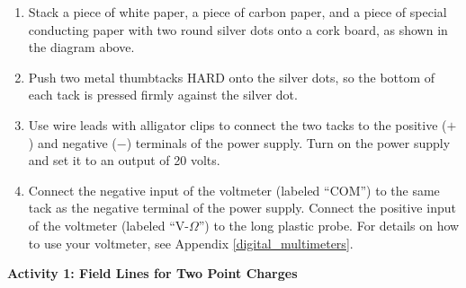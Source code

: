\begin{enumerate}[nosep]
\item Stack a piece of white paper, a piece of carbon paper, and a piece of special conducting paper with two round silver dots onto a cork board, as shown in the diagram above.
\item Push two metal thumbtacks HARD onto the silver dots, so the bottom of each tack is pressed firmly against the silver dot.
\item Use wire leads with alligator clips to connect the two tacks to the positive ($+$) and negative ($-$) terminals of the power supply.  Turn on the power supply and set it to an output of 20 volts.
\item Connect the negative input of the voltmeter (labeled ``COM'') to the same tack as the negative terminal of the power supply.  Connect the positive input of the voltmeter (labeled ``V-$\Omega$'') to the long plastic probe.  For details on how to use your voltmeter, see Appendix \ref{digital_multimeters}.
\end{enumerate}

\pagebreak[2]

\textbf{Activity 1: Field Lines for Two Point Charges}

